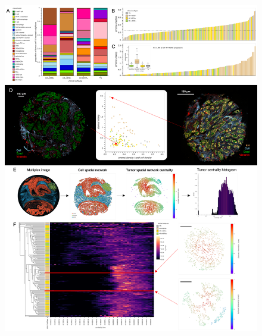 \documentclass[preprint,review,3p,12pt]{elsarticle}
\begin{document}
\begin{figure}[p]
\centering\includegraphics[width=\linewidth,
                 keepaspectratio]{fig3_condensed}
\caption{}
\label{fig:fig3}
\end{figure}

\newpage
\end{document}
